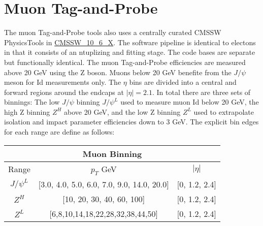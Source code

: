 \section{Muon Tag-and-Probe}
The muon Tag-and-Probe tools also uses a centrally curated CMSSW PhysicsTools in \url{CMSSW_10_6_X}. The software pipeline is identical to electons in that it consists of an ntuplizing and fitting stage. The code bases are separate but functionally identical.
The muon Tag-and-Probe efficiencies are measured above 20 GeV using the Z boson. Muons below 20 GeV benefite from the $J/\psi$ meson for Id measurements only. The $\eta$ bins are divided into a central and forward regions around the endcaps at $|\eta| = 2.1$. In total there are three sets of binnings: The low \pt $J/\psi$ binning $J/\psi^{L}$ used to measure muon Id below 20 GeV, the high \pt Z binning $Z^{H}$ above 20 GeV, and the low \pt Z binning $Z^{L}$ used to extrapolate isolation and impact parameter efficiencies down to 3 GeV.  The explicit bin edges for each range are define as follows:

\begin{tabular}{|c|c|c|}
\hline 
\multicolumn{3}{|c|}{Muon Binning} \\ 
\hline 
Range & $p_T$ GeV & $|\eta|$ \\ 
\hline 
$J/\psi^{L}$ & [3.0, 4.0,  5.0, 6.0, 7.0, 9.0, 14.0,  20.0] & [0, 1.2, 2.4] \\ 

$Z^{H}$ &  [10, 20, 30, 40, 60, 100] & [0, 1.2, 2.4] \\ 

$Z^{L}$ & [6,8,10,14,18,22,28,32,38,44,50] & [0, 1.2, 2.4] \\ 
\hline 
\end{tabular} 



